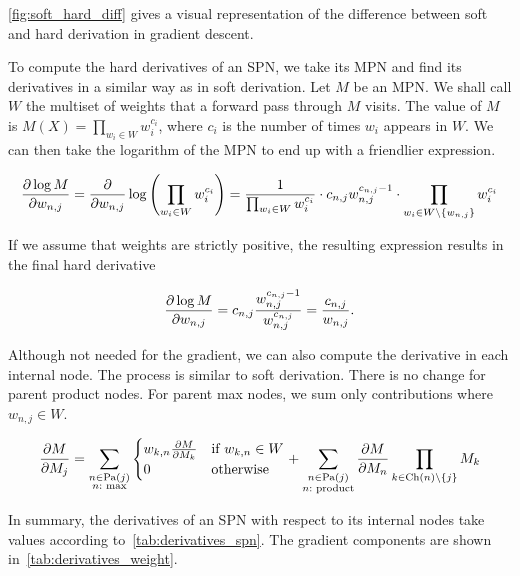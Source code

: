 \autoref{fig:soft_hard_diff} gives a visual representation of the difference between soft and hard
derivation in gradient descent.

To compute the hard derivatives of an SPN, we take its MPN and find its derivatives in a similar
way as in soft derivation. Let $M$ be an MPN\@. We shall call $W$ the multiset of weights that a
forward pass through $M$ visits. The value of $M$ is $M(X)=\prod_{w_i\in W}w_i^{c_i}$, where $c_i$
is the number of times $w_i$ appears in $W$. We can then take the logarithm of the MPN to end up
with a friendlier expression.

\begin{equation*}
  \frac{\partial\log M}{\partial w_{n,j}}=\frac{\partial}{\partial w_{n,j}}\log\left(\prod_{w_i\in W}w_i^{c_i}\right)=
    \frac{1}{\prod_{w_i\in W}w_i^{c_i}}\cdot c_{n,j}w_{n,j}^{c_{n,j}-1}\cdot\prod_{w_i\in
      W\setminus\{w_{n,j}\}}w_i^{c_i}
\end{equation*}

If we assume that weights are strictly positive, the resulting expression results in the final
hard derivative

\begin{equation}
  \frac{\partial\log M}{\partial w_{n,j}}=c_{n,j}\frac{w_{n,j}^{c_{n,j}-1}}{w_{n,j}^{c_{n,j}}}=
    \frac{c_{n,j}}{w_{n,j}}.
\end{equation}

Although not needed for the gradient, we can also compute the derivative in each internal node. The
process is similar to soft derivation. There is no change for parent product nodes. For parent max
nodes, we sum only contributions where $w_{n,j}\in W$.

\begin{equation}
  \frac{\partial M}{\partial M_j}=\sum_{\substack{n\in\operatorname*{\text{Pa}}(j)\\n:\text{ max}}}
    \begin{cases}
      w_{k,n}\frac{\partial M}{\partial M_k} & \text{if $w_{k,n}\in W$}\\
      0 & \text{otherwise}
    \end{cases}
    + \sum_{\substack{n\in\operatorname*{\text{Pa}}(j)\\n:\text{ product}}}\frac{\partial M}{\partial M_n}\prod_{k\in\operatorname*{\text{Ch}}(n)\setminus\{j\}}M_k
\end{equation}

In summary, the derivatives of an SPN with respect to its internal nodes take values according
to~\autoref{tab:derivatives_spn}. The gradient components are shown
in~\autoref{tab:derivatives_weight}.

